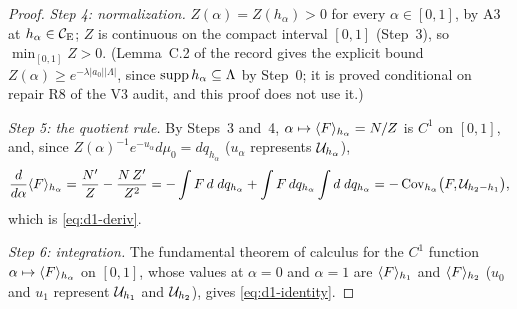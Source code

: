 \begin{proof}
\emph{Step 4: normalization.} $Z(\alpha)=Z(h_\alpha)>0$ for every $\alpha\in[0,1]$, by A3 at
$h_\alpha\in\mathcal{C}_{\mathrm E}$; $Z$ is continuous on the compact interval $[0,1]$ (Step~3), so
$\min_{[0,1]}Z>0$. (Lemma~C.2 of the record \cite[p.~40]{R} gives the explicit bound
$Z(\alpha)\ge e^{-\lambda|a_0||\Lambda|}$, since $\operatorname{supp} h_\alpha\subseteq\Lambda$ by Step~0; it is
proved conditional on repair R8 of the V3 audit, and this proof does not use it.)

\emph{Step 5: the quotient rule.} By Steps~3 and~4, $\alpha\mapsto\langle F\rangle_{h_\alpha}=N/Z$ is
$C^1$ on $[0,1]$, and, since $Z(\alpha)^{-1}e^{-u_\alpha}d\mu_0=dq_{h_\alpha}$ ($u_\alpha$
represents $\mathcal U_{h_\alpha}$),
\[
 \frac{d}{d\alpha}\langle F\rangle_{h_\alpha}=\frac{N'}{Z}-\frac{N\,Z'}{Z^2}
 =-\int F\,d\;dq_{h_\alpha}+\int F\,dq_{h_\alpha}\int d\;dq_{h_\alpha}
 =-\operatorname{Cov}_{h_\alpha}\bigl(F,\mathcal U_{h_2-h_1}\bigr),
\]
which is \eqref{eq:d1-deriv}.

\emph{Step 6: integration.} The fundamental theorem of calculus for the $C^1$ function
$\alpha\mapsto\langle F\rangle_{h_\alpha}$ on $[0,1]$, whose values at $\alpha=0$ and $\alpha=1$ are
$\langle F\rangle_{h_1}$ and $\langle F\rangle_{h_2}$ ($u_0$ and $u_1$ represent $\mathcal U_{h_1}$ and $\mathcal U_{h_2}$), gives
\eqref{eq:d1-identity}.
\end{proof}

